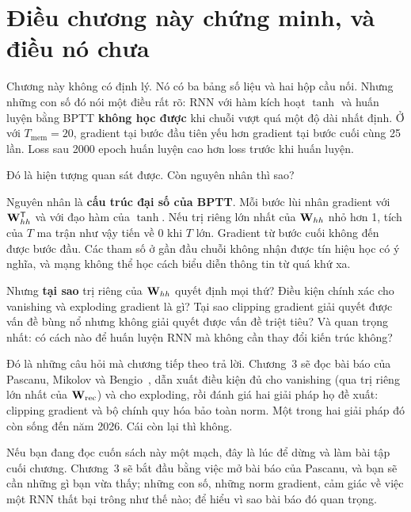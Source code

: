 %

\section{Điều chương này chứng minh, và điều nó chưa}
\label{sec:ch02-hinge}

Chương này không có định lý. Nó có ba bảng số liệu và hai hộp cầu nối. Nhưng
những con số đó nói một điều rất rõ: RNN với hàm kích hoạt $\tanh$ và huấn
luyện bằng BPTT
\textbf{không học được } khi
chuỗi vượt quá một độ dài nhất định. Ở
 với $T_{\text{mem}} = 20$, gradient
tại bước đầu tiên yếu hơn gradient tại bước cuối cùng 25 lần. Loss sau 2000
epoch huấn luyện cao hơn loss trước khi huấn luyện.

Đó là hiện tượng quan sát được. Còn nguyên nhân thì sao?

Nguyên nhân là \textbf{cấu trúc đại số của BPTT}. Mỗi bước lùi nhân gradient
với $\mathbf{W}_{hh}^{\mathsf{T}}$ và với đạo hàm của $\tanh$. Nếu trị riêng lớn
nhất của $\mathbf{W}_{hh}$ nhỏ hơn 1, tích của $T$ ma trận như vậy tiến về 0
khi $T$ lớn. Gradient từ bước cuối không đến được bước đầu. Các tham số ở
gần đầu chuỗi không nhận được tín hiệu học có ý nghĩa, và mạng không thể
học cách biểu diễn thông tin từ quá khứ xa.

Nhưng \textbf{tại sao} trị riêng của $\mathbf{W}_{hh}$ quyết định mọi thứ?
Điều kiện chính xác cho vanishing và exploding gradient là gì? Tại sao
clipping gradient giải quyết được vấn đề bùng nổ nhưng không giải quyết
được vấn đề triệt tiêu? Và quan trọng nhất: có cách nào để huấn luyện RNN
mà không cần thay đổi kiến trúc không?

Đó là những câu hỏi mà chương tiếp theo trả lời. Chương~3 sẽ đọc bài báo
của Pascanu, Mikolov và Bengio~\autocite{pascanu2013difficulty}, dẫn xuất điều kiện
đủ cho vanishing (qua trị riêng lớn nhất của $\mathbf{W}_{\text{rec}}$) và
 cho exploding, rồi đánh giá hai giải
pháp họ đề xuất: clipping
gradient và bộ chính quy hóa bảo toàn norm. Một trong hai giải pháp đó còn
sống đến năm 2026. Cái còn lại thì không.

Nếu bạn đang đọc cuốn sách này một mạch, đây là lúc để dừng và làm bài tập
cuối chương. Chương~3 sẽ bắt đầu bằng việc mở bài báo của Pascanu, và bạn
sẽ cần những gì bạn vừa thấy; những con số, những norm gradient, cảm giác
về việc một RNN thất bại trông như thế nào; để hiểu vì sao bài báo đó
quan trọng.
